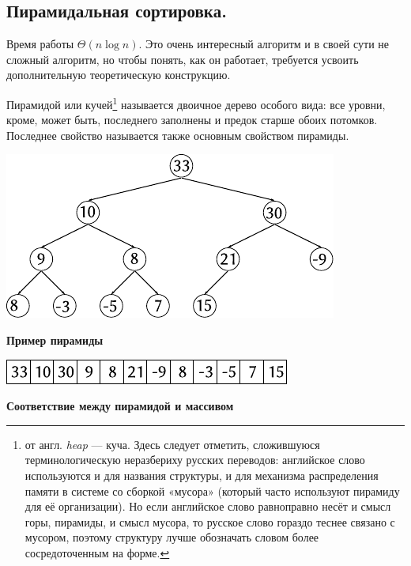 \documentclass[12pt]{article}
\begin{document}
\subsection{Пирамидальная сортировка.} Время работы $ \Theta(n\log{n})$. Это очень интересный алгоритм и в своей сути не
 сложный алгоритм, но чтобы понять, как он работает, требуется усвоить дополнительную теоретическую конструкцию.

Пирамидой или кучей\footnote{от англ. \textit{heap} — куча. Здесь следует отметить, сложившуюся терминологическую
неразбериху русских переводов: английское слово используются и для названия структуры, и для механизма распределения
памяти в системе со сборкой «мусора» (который часто используют пирамиду для её организации). Но если английское слово
равноправно несёт и смысл горы, пирамиды, и смысл мусора, то русское слово гораздо теснее связано с мусором, поэтому
структуру лучше обозначать словом более сосредоточенным на форме.} называется двоичное дерево особого вида: все уровни,
кроме, может быть, последнего заполнены и предок старше обоих потомков. Последнее свойство называется также основным
свойством пирамиды.

\begin{center}
\includegraphics{fig1.pdf}

\textbf{Пример пирамиды}
\end{center}
\begin{center}
\includegraphics{fig2.pdf}

\textbf{Соответствие между пирамидой и массивом}
\end{center}
\end{document}
